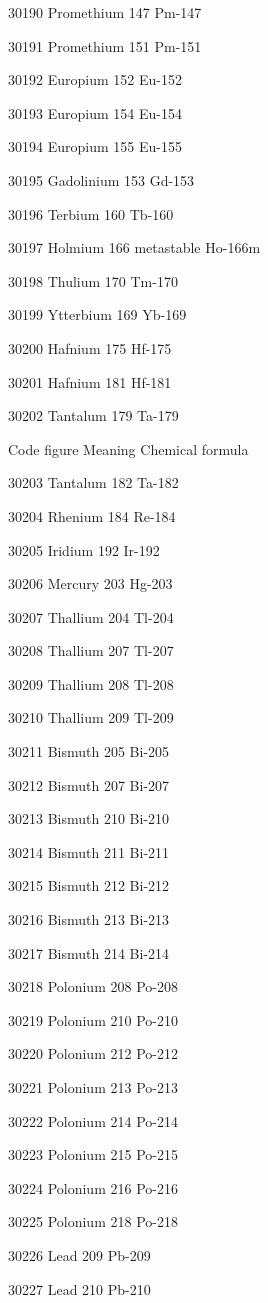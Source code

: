 30190 Promethium 147 Pm-147

30191 Promethium 151 Pm-151

30192 Europium 152 Eu-152

30193 Europium 154 Eu-154

30194 Europium 155 Eu-155

30195 Gadolinium 153 Gd-153

30196 Terbium 160 Tb-160

30197 Holmium 166 metastable Ho-166m

30198 Thulium 170 Tm-170

30199 Ytterbium 169 Yb-169

30200 Hafnium 175 Hf-175

30201 Hafnium 181 Hf-181

30202 Tantalum 179 Ta-179

Code figure Meaning Chemical formula

30203 Tantalum 182 Ta-182

30204 Rhenium 184 Re-184

30205 Iridium 192 Ir-192

30206 Mercury 203 Hg-203

30207 Thallium 204 Tl-204

30208 Thallium 207 Tl-207

30209 Thallium 208 Tl-208

30210 Thallium 209 Tl-209

30211 Bismuth 205 Bi-205

30212 Bismuth 207 Bi-207

30213 Bismuth 210 Bi-210

30214 Bismuth 211 Bi-211

30215 Bismuth 212 Bi-212

30216 Bismuth 213 Bi-213

30217 Bismuth 214 Bi-214

30218 Polonium 208 Po-208

30219 Polonium 210 Po-210

30220 Polonium 212 Po-212

30221 Polonium 213 Po-213

30222 Polonium 214 Po-214

30223 Polonium 215 Po-215

30224 Polonium 216 Po-216

30225 Polonium 218 Po-218

30226 Lead 209 Pb-209

30227 Lead 210 Pb-210

